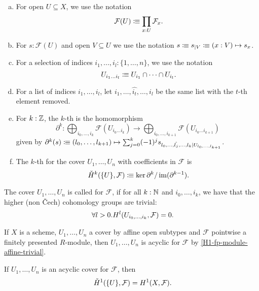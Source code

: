\begin{definition}%
  \label{chech-complex}
  \begin{enumerate}[(a)]
  \item {} For open $U\subseteq X$, we use the notation
    \[
      \mathcal F(U)\colonequiv \prod_{x:U}\mathcal F_x\rlap{.}
    \]
  \item For $s:\mathcal F(U)$ and open $V\subseteq U$ we use the notation $s\vcentcolon\mspace{-1.2mu}\equiv s_{|V} \vcentcolon\mspace{-1.2mu}\equiv (x:V)\mapsto s_x$.
  \item {}For a selection of indices $i_1,...,i_l:\{1,\dots,n\}$, we use the notation
    \[
      U_{i_1\dots i_l}\colonequiv U_{i_1}\cap\dots\cap U_{i_l}\rlap{.}
    \]
  \item For a list of indices $i_1,\dots,i_l$, let $i_1,\dots,\hat{i_t},\dots,i_l$ be the same list with the $t$-th element removed.
  \item For $k:\mathbb{Z}$, the $k$-th  is the homomorphism
    \[
      \partial^k:\bigoplus_{i_0,\dots,i_k}\mathcal F(U_{i_0\dots i_k})\to \bigoplus_{i_0,\dots,i_{k+1}}\mathcal F(U_{i_0\dots i_{k+1}})
    \]
    given by $\partial^k(s)\vcentcolon\mspace{-1.2mu}\equiv (l_0,\dots,l_{k+1}) \mapsto \sum_{j=0}^k (-1)^j s_{l_0,\dots,\hat{l_j},\dots,l_k|U_{l_0,\dots,l_{k+1}}}$.
  \item The $k$-th  for the cover $U_1,\dots,U_n$ with coefficients in $\mathcal F$ is
    \[
      \check{H}^k(\{U\},\mathcal F)\colonequiv \ker\partial^{k} / \im(\partial^{k-1})\rlap{.}
    \]
  \end{enumerate}
\end{definition}

\begin{definition}
  The cover $U_1,\dots,U_n$ is called  for $\mathcal F$,
  if for all $k:\mathbb{N}$ and $i_0,\dots,i_k$, we have that the higher (non Čech) cohomology groups are trivial:
  \[
    \forall l>0. H^l(U_{i_0,\dots,i_k},\mathcal F)=0\rlap{.}
  \]
\end{definition}

\begin{example}
  If $X$ is a scheme, $U_1,\dots,U_n$ a cover by affine open subtypes and $\mathcal F$ pointwise a finitely presented $R$-module,
  then $U_1,\dots,U_n$ is acyclic for $\mathcal F$ by \cref{H1-fp-module-affine-trivial}.
\end{example}

\begin{theorem}%
  If $U_1,\dots,U_n$ is an acyclic cover for $\mathcal F$, then
  \[
    \check{H}^1(\{U\},\mathcal F)=H^1(X,\mathcal F)\rlap{.}
  \]
\end{theorem}

